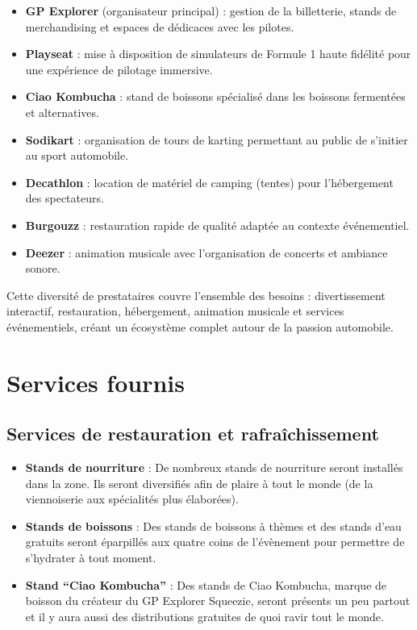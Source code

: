 \documentclass[12pt,a4paper]{article}
\begin{document}
\begin{itemize}[itemsep=0.4cm]
    \item \textbf{GP Explorer} (organisateur principal) : gestion de la billetterie, stands de merchandising et espaces de dédicaces avec les pilotes.
    
    \item \textbf{Playseat} : mise à disposition de simulateurs de Formule 1 haute fidélité pour une expérience de pilotage immersive.
    
    \item \textbf{Ciao Kombucha} : stand de boissons spécialisé dans les boissons fermentées et alternatives.
    
    \item \textbf{Sodikart} : organisation de tours de karting permettant au public de s'initier au sport automobile.
    
    \item \textbf{Decathlon} : location de matériel de camping (tentes) pour l'hébergement des spectateurs.
    
    \item \textbf{Burgouzz} : restauration rapide de qualité adaptée au contexte événementiel.
    
    \item \textbf{Deezer} : animation musicale avec l'organisation de concerts et ambiance sonore.
\end{itemize}

\vspace{0.5cm}
Cette diversité de prestataires couvre l'ensemble des besoins : divertissement interactif, restauration, hébergement, animation musicale et services événementiels, créant un écosystème complet autour de la passion automobile.

\newpage
\section{Services fournis}

\subsection{Services de restauration et rafraîchissement}

\begin{itemize}
    \item \textbf{Stands de nourriture} : De nombreux stands de nourriture seront installés dans la zone. Ils seront diversifiés afin de plaire à tout le monde (de la viennoiserie aux spécialités plus élaborées).
    
    \item \textbf{Stands de boissons} : Des stands de boissons à thèmes et des stands d'eau gratuits seront éparpillés aux quatre coins de l'évènement pour permettre de s'hydrater à tout moment.
    
    \item \textbf{Stand ``Ciao Kombucha''} : Des stands de Ciao Kombucha, marque de boisson du créateur du GP Explorer Squeezie, seront présents un peu partout et il y aura aussi des distributions gratuites de quoi ravir tout le monde.
\end{itemize}
\end{document}
